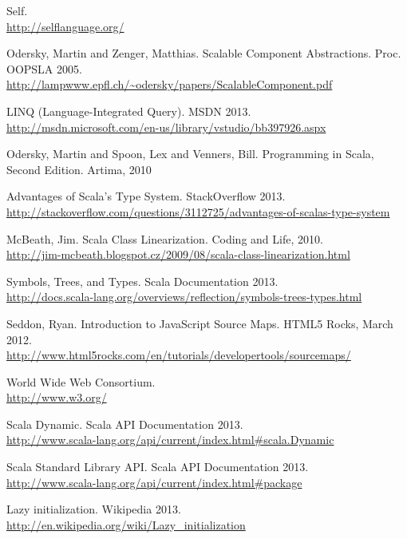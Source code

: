\begin{thebibliography}{99}
	Self.\\
	\url{http://selflanguage.org/}
	
	{\sc Odersky,} Martin and {\sc Zenger,} Matthias. Scalable Component Abstractions. Proc. OOPSLA 2005.\\
	\url{http://lampwww.epfl.ch/~odersky/papers/ScalableComponent.pdf}
	
  LINQ (Language-Integrated Query). MSDN 2013.\\
  \url{http://msdn.microsoft.com/en-us/library/vstudio/bb397926.aspx}
	
	{\sc Odersky,} Martin and {\sc Spoon,} Lex and {\sc Venners,} Bill.  Programming in Scala, Second Edition. Artima, 2010
	
	Advantages of Scala's Type System. StackOverflow 2013.\\
	\url{http://stackoverflow.com/questions/3112725/advantages-of-scalas-type-system}
	
  {\sc McBeath}, Jim. Scala Class Linearization. Coding and Life, 2010.\\
	\url{http://jim-mcbeath.blogspot.cz/2009/08/scala-class-linearization.html}
	
	Symbols, Trees, and Types. Scala Documentation 2013.\\
	\url{http://docs.scala-lang.org/overviews/reflection/symbols-trees-types.html}
	
  {\sc Seddon,} Ryan. Introduction to JavaScript Source Maps. HTML5 Rocks, March 2012.\\
  \url{http://www.html5rocks.com/en/tutorials/developertools/sourcemaps/}
	
  World Wide Web Consortium.\\
	\url{http://www.w3.org/}
	
  Scala Dynamic. Scala API Documentation 2013.\\
	\url{http://www.scala-lang.org/api/current/index.html\#scala.Dynamic}
	
	Scala Standard Library API. Scala API Documentation 2013.\\
  \url{http://www.scala-lang.org/api/current/index.html\#package}
	
  Lazy initialization. Wikipedia 2013.\\
	\url{http://en.wikipedia.org/wiki/Lazy\_initialization}
	

\end{thebibliography}
